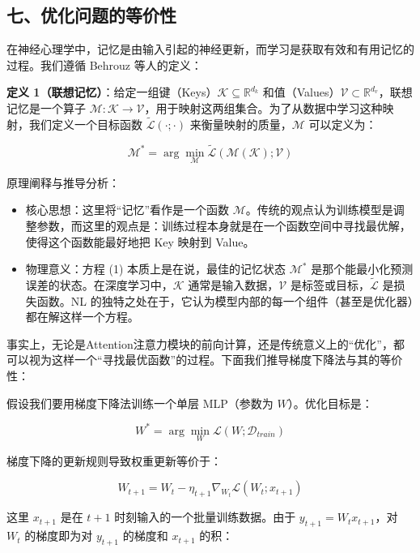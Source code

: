 \hypertarget{ux4e03ux4f18ux5316ux95eeux9898ux7684ux7b49ux4ef7ux6027}{%
\subsection{七、优化问题的等价性}\label{ux4e03ux4f18ux5316ux95eeux9898ux7684ux7b49ux4ef7ux6027}}

在神经心理学中，记忆是由输入引起的神经更新，而学习是获取有效和有用记忆的过程。我们遵循 Behrouz 等人的定义：

\textbf{定义 1（联想记忆）}：给定一组键（Keys）\(\mathcal{K}\subseteq\mathbb{R}^{d_k}\) 和值（Values）\(\mathcal{V}\subset\mathbb{R}^{d_v}\)，联想记忆是一个算子 \(\mathcal{M}:\mathcal{K}\to\mathcal{V}\)，用于映射这两组集合。为了从数据中学习这种映射，我们定义一个目标函数 \(\tilde{\mathcal{L}}(\cdot;\cdot)\) 来衡量映射的质量，\(\mathcal{M}\) 可以定义为：

\[
\mathcal{M}^*=\arg\min_{\mathcal{M}}\tilde{\mathcal{L}}(\mathcal{M}(\mathcal{K});\mathcal{V})
\tag{1}
\]

原理阐释与推导分析：

\begin{itemize}
\tightlist
\item
  核心思想：这里将``记忆''看作是一个函数 \(\mathcal{M}\)。传统的观点认为训练模型是调整参数，而这里的观点是：训练过程本身就是在一个函数空间中寻找最优解，使得这个函数能最好地把 Key 映射到 Value。
\item
  物理意义：方程 (1) 本质上是在说，最佳的记忆状态 \(\mathcal{M}^*\) 是那个能最小化预测误差的状态。在深度学习中，\(\mathcal{K}\) 通常是输入数据，\(\mathcal{V}\) 是标签或目标，\(\tilde{\mathcal{L}}\) 是损失函数。NL 的独特之处在于，它认为模型内部的每一个组件（甚至是优化器）都在解这样一个方程。
\end{itemize}

事实上，无论是Attention注意力模块的前向计算，还是传统意义上的``优化''，都可以视为这样一个``寻找最优函数''的过程。下面我们推导梯度下降法与其的等价性：

假设我们要用梯度下降法训练一个单层 MLP（参数为 \(W\)）。优化目标是：

\[
W^*=\arg\min_W\mathcal{L}(W;\mathcal{D}_{train})
\]

梯度下降的更新规则导致权重更新等价于：

\[
W_{t+1}=W_t-\eta_{t+1}\nabla_{W_t}\mathcal{L}(W_t;x_{t+1})
\]

这里 \(x_{t+1}\) 是在 \(t+1\) 时刻输入的一个批量训练数据。由于 \(y_{t+1}=W_tx_{t+1}\)，对 \(W_t\) 的梯度即为对 \(y_{t+1}\) 的梯度和 \(x_{t+1}\) 的积：


